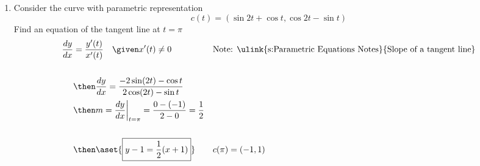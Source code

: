 \begin{enumerate}
\newpage %

  \item Consider the curve with parametric representation \[c(t) = (\sin 2t +
    \cos t, \cos 2t - \sin t)\]
    Find an equation of the tangent line at \(t=\pi\)
    \begin{align*}
      \frac{dy}{dx} &= \frac{y'(t)}{x'(t)} \quad \given x'(t) \neq 0
     &&\text{Note: \ulink{s:Parametric Equations Notes}{Slope of a tangent line}} \\
     \\
     &\then \frac{dy}{dx} = \frac{-2\sin(2t) - \cos t}{2\cos(2t) - \sin t} \\
     &\then m = \frac{dy}{dx} \bigg|_{t=\pi} = \frac{0 - (-1)}{2 - 0} = \frac{1}{2}\\
     \\
     &\then \aset{\boxed{y - 1 = \frac{1}{2}(x+1)}}
      && c(\pi) = (-1, 1)\\
    \end{align*}
\end{enumerate}
